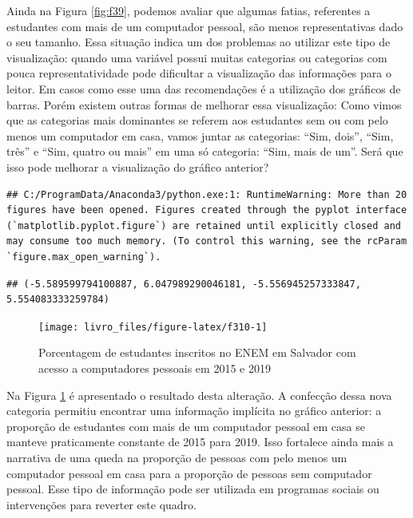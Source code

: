 \documentclass[
  oneside]{book}
\begin{document}
Ainda na Figura \ref{fig:f39}, podemos avaliar que algumas fatias, referentes a estudantes com mais de um computador pessoal, são menos representativas dado o seu tamanho. Essa situação indica um dos problemas ao utilizar este tipo de visualização: quando uma variável possui muitas categorias ou categorias com pouca representatividade pode dificultar a visualização das informações para o leitor. Em casos como esse uma das recomendações é a utilização dos gráficos de barras. Porém existem outras formas de melhorar essa visualização: Como vimos que as categorias mais dominantes se referem aos estudantes sem ou com pelo menos um computador em casa, vamos juntar as categorias: ``Sim, dois'', ``Sim, três'' e ``Sim, quatro ou mais'' em uma só categoria: ``Sim, mais de um''. Será que isso pode melhorar a visualização do gráfico anterior?

\begin{verbatim}
## C:/ProgramData/Anaconda3/python.exe:1: RuntimeWarning: More than 20 figures have been opened. Figures created through the pyplot interface (`matplotlib.pyplot.figure`) are retained until explicitly closed and may consume too much memory. (To control this warning, see the rcParam `figure.max_open_warning`).
\end{verbatim}

\begin{verbatim}
## (-5.589599794100887, 6.047989290046181, -5.556945257333847, 5.554083333259784)
\end{verbatim}

\begin{figure}

{\centering \texttt{[image: livro\_files/figure-latex/f310-1]} 

}

\caption{Porcentagem de estudantes inscritos no ENEM em Salvador com acesso a computadores pessoais em 2015 e 2019}\label{fig:f310}
\end{figure}

Na Figura \ref{fig:f310} é apresentado o resultado desta alteração. A confecção dessa nova categoria permitiu encontrar uma informação implícita no gráfico anterior: a proporção de estudantes com mais de um computador pessoal em casa se manteve praticamente constante de 2015 para 2019. Isso fortalece ainda mais a narrativa de uma queda na proporção de pessoas com pelo menos um computador pessoal em casa para a proporção de pessoas sem computador pessoal. Esse tipo de informação pode ser utilizada em programas sociais ou intervenções para reverter este quadro.
\end{document}
